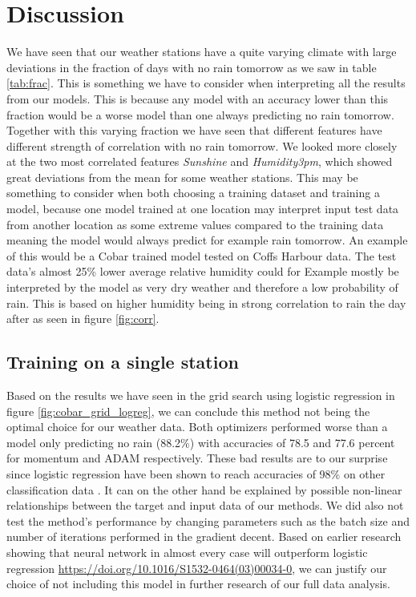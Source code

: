 \documentclass[11pt]{article}
\begin{document}
\section{Discussion}
We have seen that our weather stations have a quite varying climate with large deviations in the fraction of days with no rain tomorrow as we saw in table \ref{tab:frac}. This is something we have to consider when interpreting all the results from our models. This is because any model with an accuracy lower than this fraction would be a worse model than one always predicting no rain tomorrow. Together with this varying fraction we have seen that different features have different strength of correlation with no rain tomorrow. We looked more closely at the two most correlated features \textit{Sunshine} and \textit{Humidity3pm}, which showed great deviations from the mean for some weather stations. This may be something to consider when both choosing a training dataset and training a model, because one model trained at one location may interpret input test data from another location as some extreme values compared to the training data meaning the model would always predict for example rain tomorrow. An example of this would be a Cobar trained model tested on Coffs Harbour data. The test data's almost 25\% lower average relative humidity could for Example mostly be interpreted by the model as very dry weather and therefore a low probability of rain. This is based on higher humidity being in strong correlation to rain the day after as seen in figure \ref{fig:corr}.

\subsection{Training on a single station} %
\label{sub:Training on a single station}
Based on the results we have seen in the grid search using logistic regression in figure \ref{fig:cobar_grid_logreg}, we can conclude this method not being the optimal choice for our weather data. Both optimizers performed worse than a model only predicting no rain (88.2\%) with accuracies of 78.5 and 77.6 percent for momentum and ADAM respectively. These bad results are to our surprise since logistic regression have been shown to reach accuracies of 98\% on other classification data \cite{project2}. It can on the other hand be explained by possible non-linear relationships between the target and input data of our methods. We did also not test the method's performance by changing parameters such as the batch size and number of iterations performed in the gradient decent. Based on earlier research showing that neural network in almost every case will outperform logistic regression \url{https://doi.org/10.1016/S1532-0464(03)00034-0}, we can justify our choice of not including this model in further research of our full data analysis.
\end{document}
